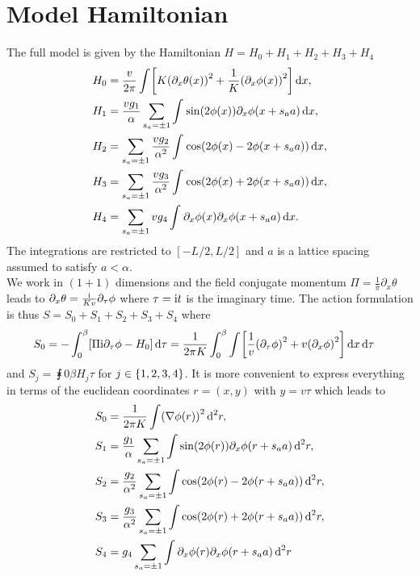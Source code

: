 \documentclass[english, parskip=full]{scrartcl}
\begin{document}
\section{Model Hamiltonian}
The full model is given by the Hamiltonian $H=H_0+H_1+H_2 + H_3 + H_4$
\begin{align}
H_0 &= \frac{v}{2\pi} \intx{ }{ }{\klb*{K\kla*{\partial_x\theta(x)}^2 + \frac{1}{K} \kla*{\partial_x\phi(x)}^2}}{x},\\
H_1 &= \frac{vg_1}{\alpha} \sum_{s_a=\pm 1} \intx{ }{ }{\sin\kla*{2\phi(x)} \partial_x\phi(x+s_aa)}{x},\\
H_2 &= \sum_{s_a=\pm 1} \frac{vg_2}{\alpha^2} \intx{ }{ }{\cos\kla*{2\phi(x) - 2\phi(x+s_aa)}}{x},\\
H_3 &= \sum_{s_a=\pm 1} \frac{vg_3}{\alpha^2} \intx{ }{ }{\cos\kla*{2\phi(x) + 2\phi(x+s_aa)}}{x},\\
H_4 &= \sum_{s_a=\pm 1} vg_4 \intx{ }{ }{\partial_x\phi(x) \partial_x\phi(x+s_aa)}{x}.
\end{align}
The integrations are restricted to $[-L/2, L/2]$ and $a$ is a lattice spacing assumed to satisfy $a<\alpha$.\\
We work in $(1+1)$ dimensions and the field conjugate momentum $\Pi = \frac{1}{\pi} \partial_x \theta$ leads to $\partial_x\theta = \frac{\i}{Kv} \partial_\tau\phi$ where $\tau=\i t$ is the imaginary time.
The action formulation is thus $S=S_0 + S_1 + S_2 + S_3 + S_4$ where
\begin{align}
S_0 &= -\intx{0}{\beta}{\klb*{\Pi \i\partial_\tau\phi - H_0} }{\tau} = \frac{1}{2\pi K} \intx{0}{\beta}{\intx{ }{ }{\klb*{\frac{1}{v} \kla*{\partial_\tau \phi}^2 + v \kla*{\partial_x \phi}^2}}{x}}{\tau}
\end{align}
and $S_j = \intx{0}{\beta}{H_j}{\tau}$ for $j\in\klc*{1,2,3,4}$.
It is more convenient to express everything in terms of the euclidean coordinates $r = (x,y)$ with $y=v\tau$ which leads to
\begin{align}
S_0 &= \frac{1}{2\pi K} \int \kla*{\nabla\phi(r)}^2 \,\d^2r,\\
S_1 &= \frac{g_1}{\alpha} \sum_{s_a=\pm 1} \int \sin \kla*{2 \phi(r)} \partial_x \phi(r+s_aa) \,\d^2r,\\
S_2 &= \frac{g_2}{\alpha^2} \sum_{s_a=\pm 1} \int \cos\kla*{2\phi(r) - 2\phi(r+s_aa)}\,\d^2r,\\
S_3 &= \frac{g_3}{\alpha^2} \sum_{s_a=\pm 1} \int \cos\kla*{2\phi(r) + 2\phi(r+s_aa)}\,\d^2r,\\
S_4 &= g_4 \sum_{s_a=\pm 1} \int \partial_x\phi(r) \partial_x\phi(r+s_aa)\,\d^2r
\end{align}
\end{document}
